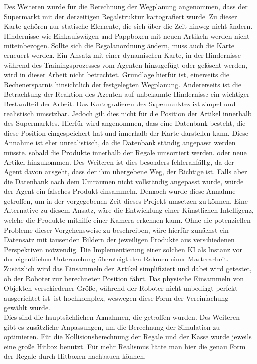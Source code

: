 Des Weiteren wurde für die Berechnung der Wegplanung angenommen, dass der Supermarkt mit der derzeitigen Regalstruktur kartografiert wurde. Zu dieser Karte gehören nur statische Elemente, die sich über die Zeit hinweg nicht ändern. Hindernisse wie Einkaufswägen und Pappboxen mit neuen Artikeln werden nicht miteinbezogen. Sollte sich die Regalanordnung ändern, muss auch die Karte erneuert werden. Ein Ansatz mit einer dynamischen Karte, in der Hindernisse während des Trainingsprozesses vom Agenten hinzugefügt oder gelöscht werden, wird in dieser Arbeit nicht betrachtet. Grundlage hierfür ist, einerseits die Rechenersparnis hinsichtlich der festgelegten Wegplanung. Andererseits ist die Betrachtung der Reaktion des Agenten auf unbekannte Hindernisse ein wichtiger Bestandteil der Arbeit. Das Kartografieren des Supermarktes ist simpel und realistisch umsetzbar. Jedoch gilt dies nicht für die Position der Artikel innerhalb des Supermarktes. Hierfür wird angenommen, dass eine Datenbank besteht, die diese Position eingespeichert hat und innerhalb der Karte darstellen kann. Diese Annahme ist eher unrealistisch, da die Datenbank ständig angepasst werden müsste, sobald die Produkte innerhalb der Regale umsortiert werden, oder neue Artikel hinzukommen. Des Weiteren ist dies besonders fehleranfällig, da der Agent davon ausgeht, dass der ihm übergebene Weg, der Richtige ist. Falls aber die Datenbank nach dem Umräumen nicht vollständig angepasst wurde, würde der Agent ein falsches Produkt einsammeln. Dennoch wurde diese Annahme getroffen, um in der vorgegebenen Zeit dieses Projekt umsetzen zu können. Eine Alternative zu diesem Ansatz, wäre die Entwicklung einer Künstlichen Intelligenz, welche die Produkte mithilfe einer Kamera erkennen kann. Ohne die potenziellen Probleme dieser Vorgehensweise zu beschreiben, wäre hierfür zunächst ein Datensatz mit tausenden Bildern der jeweiligen Produkte aus verschiedenen Perspektiven notwendig. Die Implementierung einer solchen KI als Instanz vor der eigentlichen Untersuchung übersteigt den Rahmen einer Masterarbeit. 
\\
Zusätzlich wird das Einsammeln der Artikel simplifiziert und dabei wird getestet, ob der Roboter zur berechneten Position fährt. Das physische Einsammeln von Objekten verschiedener Größe, während der Roboter nicht unbedingt perfekt ausgerichtet ist, ist hochkomplex, weswegen diese Form der Vereinfachung gewählt wurde.
\\
Dies sind die hauptsächlichen Annahmen, die getroffen wurden. Des Weiteren gibt es zusätzliche Anpassungen, um die Berechnung der Simulation zu optimieren. Für die Kollisionsberechnung der Regale und der Kasse wurde jeweils eine große Hitbox benutzt. Für mehr Realismus hätte man hier die genau Form der Regale durch Hitboxen nachbauen können. 
